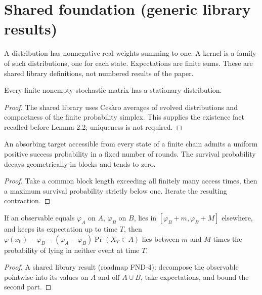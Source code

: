 \section{Shared foundation (generic library results)}
\begin{definition}\label{def:weights}
\leanok
A distribution has nonnegative real weights summing to one. A kernel is a
family of such distributions, one for each state. Expectations are finite sums.
These are shared library definitions, not numbered results of the paper.
\end{definition}
\begin{theorem}\label{thm:stationary}
\leanok{}
Every finite nonempty stochastic matrix has a stationary distribution.
\end{theorem}
\begin{proof}\leanok
The shared library uses Ces\`aro averages of evolved distributions and
compactness of the finite probability simplex. This supplies the existence
fact recalled before Lemma 2.2; uniqueness is not required.
\end{proof}
\begin{theorem}\label{thm:generic-absorption}
\leanok{}
An absorbing target accessible from every state of a finite chain admits a
uniform positive success probability in a fixed number of rounds. The survival
probability decays geometrically in blocks and tends to zero.
\end{theorem}
\begin{proof}\leanok
Take a common block length exceeding all finitely many access times, then a
maximum survival probability strictly below one. Iterate the resulting contraction.
\end{proof}
\begin{theorem}\label{thm:optional-stopping}
\leanok{}
If an observable equals $\varphi_A$ on $A$, $\varphi_B$ on $B$, lies in
$[\varphi_B+m,\varphi_B+M]$ elsewhere, and keeps its expectation up to time $T$, then
$\varphi(x_0)-\varphi_B-(\varphi_A-\varphi_B)\Pr(X_T\in A)$ lies between $m$ and $M$
times the probability of lying in neither event at time $T$.
\end{theorem}
\begin{proof}\leanok
A shared library result (roadmap FND-4): decompose the observable pointwise into its values
on $A$ and off $A\cup B$, take expectations, and bound the second part.
\end{proof}

